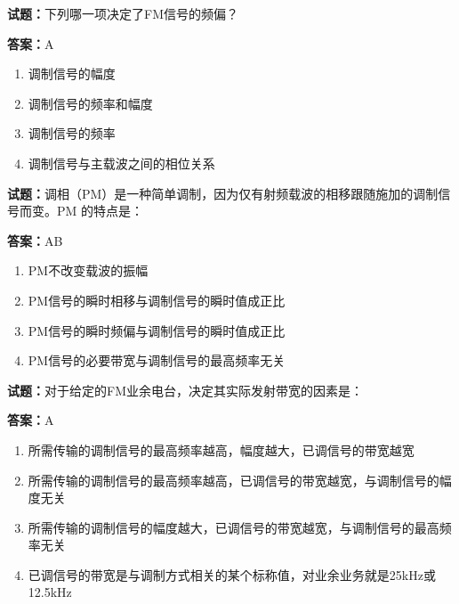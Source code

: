 \documentclass{ctexbook}
\begin{document}





\vspace{1em}

\textbf{试题：}下列哪一项决定了FM信号的频偏？ 

\textbf{答案：}A 

\begin{enumerate}[leftmargin=3em]
  \item 调制信号的幅度 

  \item 调制信号的频率和幅度 

  \item 调制信号的频率 

  \item 调制信号与主载波之间的相位关系 

\end{enumerate}





\vspace{1em}

\textbf{试题：}调相（PM）是一种简单调制，因为仅有射频载波的相移跟随施加的调制信号而变。PM
的特点是： 

\textbf{答案：}AB 

\begin{enumerate}[leftmargin=3em]
  \item PM不改变载波的振幅 

  \item PM信号的瞬时相移与调制信号的瞬时值成正比 

  \item PM信号的瞬时频偏与调制信号的瞬时值成正比 

  \item PM信号的必要带宽与调制信号的最高频率无关 

\end{enumerate}





\vspace{1em}

\textbf{试题：}对于给定的FM业余电台，决定其实际发射带宽的因素是： 

\textbf{答案：}A 

\begin{enumerate}[leftmargin=3em]
  \item 所需传输的调制信号的最高频率越高，幅度越大，已调信号的带宽越宽 

  \item 所需传输的调制信号的最高频率越高，已调信号的带宽越宽，与调制信号的幅度无关 

  \item 所需传输的调制信号的幅度越大，已调信号的带宽越宽，与调制信号的最高频率无关 

  \item 已调信号的带宽是与调制方式相关的某个标称值，对业余业务就是25kHz或12.5kHz 

\end{enumerate}
\end{document}
